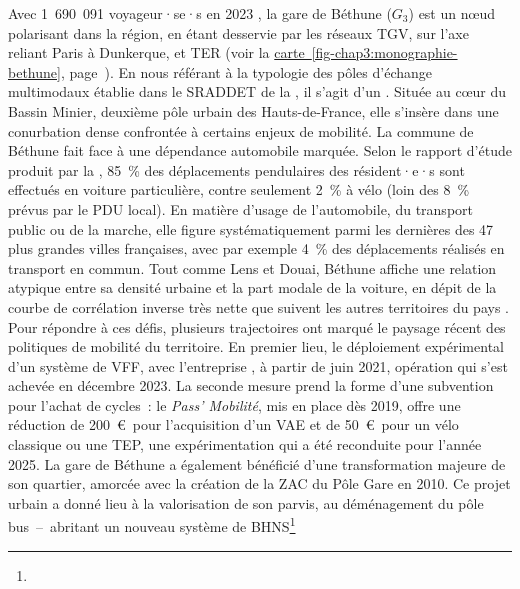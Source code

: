 \begin{refsegment}
Avec 1~690~091 voyageur·se·s en 2023 \textcolor{blue}{\autocite{sncf_frequentation_2024}}, la gare de Béthune (\(G_3\)) est un nœud polarisant dans la région, en étant desservie par les réseaux \acrshort{TGV}, sur l'axe reliant Paris à Dunkerque, et \acrshort{TER} (voir la \hyperref[fig-chap3:monographie-bethune]{carte~\ref{fig-chap3:monographie-bethune}}, page~\pageref{fig-chap3:monographie-bethune}). En nous référant à la typologie des pôles d'échange multimodaux établie dans le \acrshort{SRADDET} de la \textcolor{blue}{\textcite[81]{region_hauts-de-france_sraddet_2024}}, il s'agit d'un . Située au cœur du Bassin Minier, deuxième pôle urbain des Hauts-de-France, elle s'insère dans une conurbation dense confrontée à certains enjeux de mobilité. La commune de Béthune fait face à une dépendance automobile marquée. Selon le rapport d'étude produit par la \textcolor{blue}{\textcite[12, 15, 19]{fnaut_deplacements_2022}}, 85~\% des déplacements pendulaires des résident·e·s sont effectués en voiture particulière, contre seulement 2~\% à vélo (loin des 8~\% prévus par le \acrshort{PDU} local). En matière d'usage de l'automobile, du transport public ou de la marche, elle figure systématiquement parmi les dernières des 47 plus grandes villes françaises, avec par exemple 4~\% des déplacements réalisés en transport en commun. Tout comme Lens et Douai, Béthune affiche une relation atypique entre sa densité urbaine et la part modale de la voiture, en dépit de la courbe de corrélation inverse très nette que suivent les autres territoires du pays \textcolor{blue}{\autocite[45]{fnaut_deplacements_2022}}. Pour répondre à ces défis, plusieurs trajectoires ont marqué le paysage récent des politiques de mobilité du territoire. En premier lieu, le déploiement expérimental d'un système de \acrshort{VFF}, avec l'entreprise , à partir de juin 2021, opération qui s'est achevée en décembre 2023. La seconde mesure prend la forme d'une subvention pour l'achat de cycles~: le \textsl{Pass' Mobilité}, mis en place dès 2019, offre une réduction de 200~\euro~pour l'acquisition d'un \acrshort{VAE} et de 50~\euro~pour un vélo classique ou une \acrshort{TEP}, une expérimentation qui a été reconduite pour l'année 2025. La gare de Béthune a également bénéficié d'une transformation majeure de son quartier, amorcée avec la création de la \acrfull{ZAC} du Pôle Gare en 2010. Ce projet urbain a donné lieu à la valorisation de son parvis, au déménagement du pôle bus~–~abritant un nouveau système de \acrshort{BHNS}\footnote{
}
\end{refsegment}
